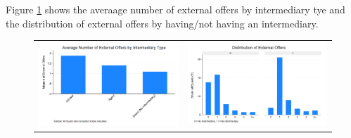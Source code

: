 \documentclass[12pt]{article}
\begin{document}




 Figure \ref{fig:ie4_8and9} shows the averaage number of external offers by intermediary tye and the distribution of external offers by having/not having an intermediary. 

 
\begin{figure}[H]
\caption{}
 \label{fig:ie4_8and9}
\centering{}%
\begin{tabular}{cc}
\includegraphics[scale=0.17]{figures/IE4/IE4_external_offers_by_intermediary.png} & \includegraphics[scale=0.17]{figures/IE4/IE4_external_distribution_by_intermediary.png} 
\end{tabular}
\end{figure} 
 
\end{document}
